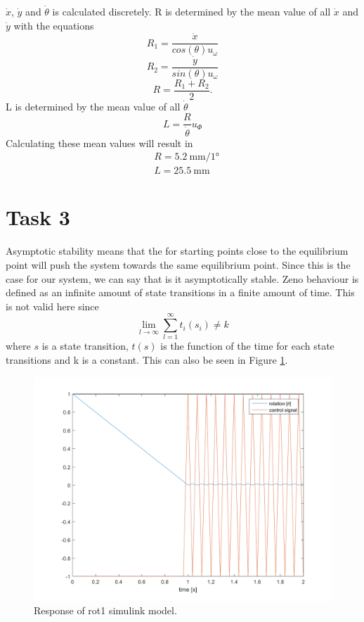 \documentclass[a4paper,12pt,oneside,onecolumn]{article} %
\begin{document}
$\dot{x}$, $\dot{y}$ and $\dot{\theta}$ is calculated discretely. R is determined by the mean value of all $\dot{x}$ and $\dot{y}$ with the equations
	\begin{equation}
		R_1 = \frac{\dot{x}}{cos(\theta)u_\omega}
	\end{equation}
	\begin{equation}
		R_2 = \frac{\dot{y}}{sin(\theta)u_\omega}
	\end{equation}
	\begin{equation}
		R = \frac{R_1 + R_2}{2}. %
	\end{equation}
L is determined by the mean value of all $\dot{\theta}$
	\begin{equation}
		L =  \frac{R}{\dot{\theta}}u_\Phi
	\end{equation}
        Calculating these mean values will result in
	\begin{align*}
          &R = 5.2\ \si{\milli\meter/\ang{1}} \\
          &L = 25.5\ \si{\milli\meter}
	\end{align*}

\section*{Task 3}
        Asymptotic stability means that the for starting points close to the
        equilibrium point will push the system towards the same equilibrium point.
        Since this is the case for our system, we can say that is it
        asymptotically stable.
	Zeno behaviour is defined as an infinite amount of state
        transitions in a finite amount of time. This is not valid here
        since 
        \begin{equation}
          \lim_{l \to \infty}\sum\limits_{l=1}^\infty t_i(s_i) \neq k
        \end{equation}
        where $s$ is a state transition, $t(s)$ is the function of the time 
        for each state transitions and k is a constant.
        This can also be seen in Figure \ref{fig:task3_plot}.
        \begin{figure}[H]
        \centering
        \includegraphics[scale=0.5]{../matlab/images/task3_plot.png}
        \caption{Response of rot1 simulink model.}
        \label{fig:task3_plot}
    \end{figure}
\end{document}
